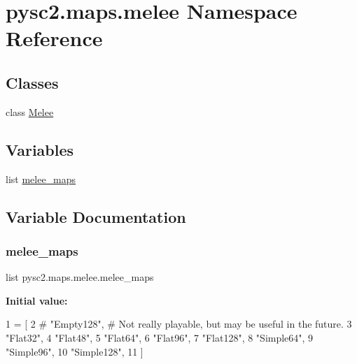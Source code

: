 \hypertarget{namespacepysc2_1_1maps_1_1melee}{}\section{pysc2.\+maps.\+melee Namespace Reference}
\label{namespacepysc2_1_1maps_1_1melee}
\subsection*{Classes}
\begin{DoxyCompactItemize}
\item 
class \mbox{\hyperlink{classpysc2_1_1maps_1_1melee_1_1_melee}{Melee}}
\end{DoxyCompactItemize}
\subsection*{Variables}
\begin{DoxyCompactItemize}
\item 
list \mbox{\hyperlink{namespacepysc2_1_1maps_1_1melee_a2069212e8a83fa5c67348752f1508ffb}{melee\+\_\+maps}}
\end{DoxyCompactItemize}


\subsection{Variable Documentation}
\mbox{\label{namespacepysc2_1_1maps_1_1melee_a2069212e8a83fa5c67348752f1508ffb}} 
\subsubsection{\texorpdfstring{melee\+\_\+maps}{melee\_maps}}
{\footnotesize\ttfamily list pysc2.\+maps.\+melee.\+melee\+\_\+maps}

{\bfseries Initial value\+:}
\begin{DoxyCode}
1 =  [
2     \textcolor{comment}{# "Empty128",  # Not really playable, but may be useful in the future.}
3     \textcolor{stringliteral}{"Flat32"},
4     \textcolor{stringliteral}{"Flat48"},
5     \textcolor{stringliteral}{"Flat64"},
6     \textcolor{stringliteral}{"Flat96"},
7     \textcolor{stringliteral}{"Flat128"},
8     \textcolor{stringliteral}{"Simple64"},
9     \textcolor{stringliteral}{"Simple96"},
10     \textcolor{stringliteral}{"Simple128"},
11 ]
\end{DoxyCode}
